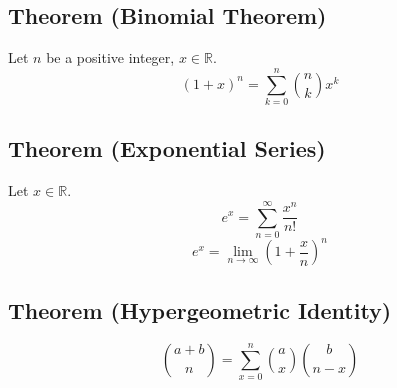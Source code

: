 \begin{thmbox}
    \subsection{Theorem (Binomial Theorem)}
    Let $ n $ be a positive integer, $ x\in\mathbb{R} $.
    \[ (1+x)^n=\sum\limits_{k=0}^{n} \binom{n}{k}x^k \]
\end{thmbox}

\begin{thmbox}
    \subsection{Theorem (Exponential Series)}
    Let $ x\in\mathbb{R} $.
    \[ e^x=\sum\limits_{n=0}^{\infty}\frac{x^n}{n!}  \]
    \[ e^x=\lim\limits_{{n} \to {\infty}} \left( 1+\frac{x}{n}  \right)^n \]
\end{thmbox}

\begin{thmbox}
    \subsection{Theorem (Hypergeometric Identity)}
    \[ \binom{a+b}{n}=\sum\limits_{x=0}^{n} \binom{a}{x}\binom{b}{n-x} \]
\end{thmbox}